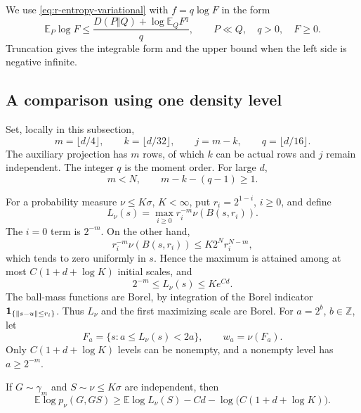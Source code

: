 We use \eqref{eq:r-entropy-variational} with \(f=q\log F\) in the form
\begin{equation}\label{rlevels:tilt}
 \mathbb E_P\log F
 \le \frac{D(P\Vert Q)+\log\mathbb E_Q F^q}{q},
 \qquad P\ll Q,\quad q>0,\quad F\ge0.
\end{equation}
Truncation gives the integrable form and the upper bound when the
left side is negative infinite.

\subsection{A comparison using one density level}
\label{rlevels:one-level}

Set, locally in this subsection,
\begin{equation}\label{rlevels:one-parameters}
 m=\lfloor d/4\rfloor,\qquad k=\lfloor d/32\rfloor,\qquad
 j=m-k,\qquad q=\lfloor d/16\rfloor.
\end{equation}
The auxiliary projection has \(m\) rows, of which \(k\) can be actual
rows and \(j\) remain independent.  The integer \(q\) is the moment
order.  For large \(d\),
\[
 m<N,\qquad m-k-(q-1)\ge1.
\]

For a probability measure \(\nu\le K\sigma\), \(K<\infty\), put
\(r_i=2^{1-i}\), \(i\ge0\), and define
\begin{equation}\label{rlevels:one-maximal}
 L_\nu(s)=\max_{i\ge0} r_i^{-m}\nu(B(s,r_i)).
\end{equation}
The \(i=0\) term is \(2^{-m}\).  On the other hand,
\[
 r_i^{-m}\nu(B(s,r_i))\le K2^N r_i^{N-m},
\]
which tends to zero uniformly in \(s\).  Hence the maximum is
attained among at most \(C(1+d+\log K)\) initial scales, and
\[
 2^{-m}\le L_\nu(s)\le Ke^{Cd}.
\]
The ball-mass functions are Borel, by integration of the Borel
indicator \(\mathbf 1_{\{\|s-u\|\le r_i\}}\).  Thus \(L_\nu\) and the
first maximizing scale are Borel.  For \(a=2^b\), \(b\in\mathbb Z\),
let
\[
 F_a=\{s:a\le L_\nu(s)<2a\},\qquad w_a=\nu(F_a).
\]
Only \(C(1+d+\log K)\) levels can be nonempty, and a nonempty level
has \(a\ge2^{-m}\).

\begin{lemma}
\label{rlevels:one-net}
If \(G\sim\gamma_m\) and \(S\sim\nu\le K\sigma\) are
independent, then
\begin{equation}\label{rlevels:one-net-bound}
 \mathbb E\log p_\nu(G,GS)
 \ge \mathbb E\log L_\nu(S)-Cd
       -\log\!\bigl(C(1+d+\log K)\bigr).
\end{equation}
\end{lemma}

